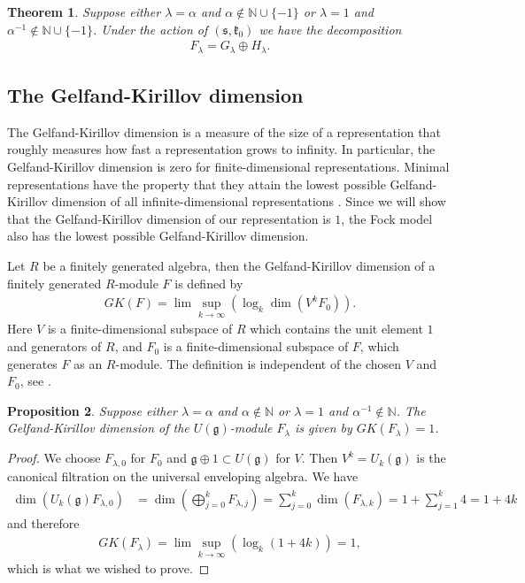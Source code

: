 \documentclass{amsart}
\newtheorem{theorem}{Theorem}
\newtheorem{Prop}[theorem]{Proposition}
\numberwithin{theorem}{section}
\theoremstyle{definition}
\theoremstyle{remark}
\def\N{\mathds{N} }
\newcommand{\mf}[1]{\mathfrak{#1}}
\begin{document}
\begin{theorem}
Suppose either $\lambda=\alpha$ and $\alpha\not\in \N\cup \{-1\}$ or $\lambda=1$ and $\alpha^{-1}\not\in \N\cup \{-1\}$. Under the action of $(\mf s, \mf k_0)$ we have the decomposition
\begin{align*}
F_\lambda = G_\lambda \oplus H_\lambda.
\end{align*}
\end{theorem}

\subsection{The Gelfand-Kirillov dimension}

The Gelfand-Kirillov dimension is a measure of the size of a representation that roughly measures how fast a representation grows to infinity. In particular, the  Gelfand-Kirillov dimension is zero for finite-dimensional representations. Minimal representations have the property that they attain the lowest possible Gelfand-Kirillov dimension of all infinite-dimensional representations \cite{GanSavin}. Since we will show that the Gelfand-Kirillov dimension of our representation is $1$, the Fock model also has the lowest possible Gelfand-Kirillov dimension. 

 Let $R$ be a finitely generated algebra, then the Gelfand-Kirillov dimension of a finitely generated $R$-module $F$ is defined by
\begin{align*}
GK(F) = \lim\sup_{k\rightarrow \infty} \left(\log_k\dim(V^kF_0)\right).
\end{align*}
Here $V$ is a finite-dimensional subspace of $R$ which contains the unit element $1$ and generators of $R$, and $F_0$ is a finite-dimensional subspace of $F$, which generates $F$ as an $R$-module. The definition is independent of the chosen $V$ and $F_0$, see \cite[Section 7.3]{Mu}.

\begin{Prop} \label{Prop Gelfand-Kirillov dimension}
Suppose either $\lambda=\alpha$ and $\alpha\not\in \N$ or $\lambda=1$ and $\alpha^{-1}\not\in \N$. The Gelfand-Kirillov dimension of the $U(\mf g)$-module $F_\lambda$ is given by $GK(F_\lambda) = 1$.
\end{Prop}

\begin{proof}
We choose $F_{\lambda,0}$ for $F_0$ and $\mf g \oplus 1\subset U(\mf g)$ for $V$. Then $V^k = U_k(\mf g)$ is the canonical filtration on the universal enveloping algebra.
We have
\begin{align*}
\dim\left(U_k(\mf g) F_{\lambda,0}\right) &= \dim\left(\bigoplus_{j=0}^k F_{\lambda,j}\right) = \sum_{j=0}^k \dim(F_{\lambda,k}) = 1 + \sum_{j=1}^k 4 = 1+4k
\end{align*}
and therefore
\begin{align*}
GK(F_\lambda) = \lim\sup_{k\rightarrow \infty} \left(\log_k(1+4k)\right) = 1,
\end{align*}
which is what we wished to prove.
\end{proof}
\end{document}
